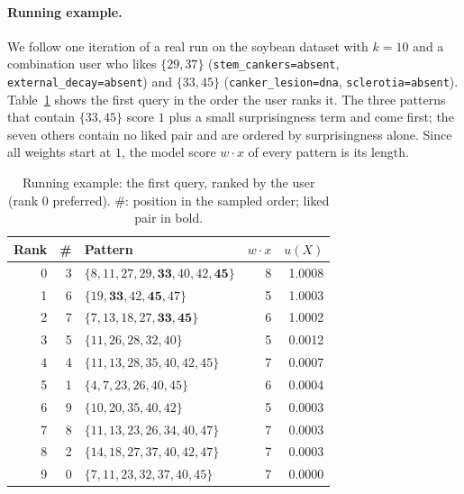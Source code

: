 \paragraph{Running example.}
\label{ex:running}
We follow one iteration of a real run on the soybean dataset with $k = 10$ and a combination user who likes
$\{29, 37\}$ (\texttt{stem\_cankers=absent}, \texttt{external\_decay=absent}) and $\{33, 45\}$
(\texttt{canker\_lesion=dna}, \texttt{sclerotia=absent}). Table~\ref{tab:ex_query} shows the first query in
the order the user ranks it. The three patterns that contain $\{33, 45\}$ score $1$ plus a small
surprisingness term and come first; the seven others contain no liked pair and are ordered by surprisingness
alone. Since all weights start at $1$, the model score $w \cdot x$ of every pattern is its length.

\begin{table}[t]
\centering
\caption{Running example: the first query, ranked by the user (rank $0$ preferred). \#: position in the
sampled order; liked pair in bold.}
\label{tab:ex_query}
\small
\setlength{\tabcolsep}{4pt}
\begin{tabular}{rrlrr}
\toprule
Rank & \# & Pattern & $w \cdot x$ & $u(X)$ \\
\midrule
0 & 3 & $\{8,11,27,29,\mathbf{33},40,42,\mathbf{45}\}$ & 8 & 1.0008 \\
1 & 6 & $\{19,\mathbf{33},42,\mathbf{45},47\}$          & 5 & 1.0003 \\
2 & 7 & $\{7,13,18,27,\mathbf{33},\mathbf{45}\}$        & 6 & 1.0002 \\
3 & 5 & $\{11,26,28,32,40\}$                            & 5 & 0.0012 \\
4 & 4 & $\{11,13,28,35,40,42,45\}$                      & 7 & 0.0007 \\
5 & 1 & $\{4,7,23,26,40,45\}$                           & 6 & 0.0004 \\
6 & 9 & $\{10,20,35,40,42\}$                            & 5 & 0.0003 \\
7 & 8 & $\{11,13,23,26,34,40,47\}$                      & 7 & 0.0003 \\
8 & 2 & $\{14,18,27,37,40,42,47\}$                      & 7 & 0.0003 \\
9 & 0 & $\{7,11,23,32,37,40,45\}$                       & 7 & 0.0000 \\
\bottomrule
\end{tabular}
\end{table}

